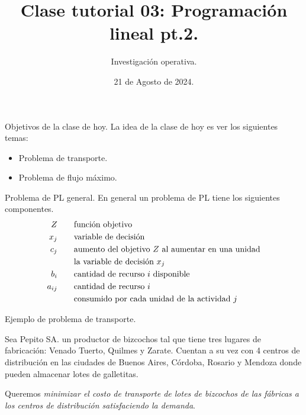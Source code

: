 \documentclass{beamer}
\title[]{Clase tutorial 03: Programación lineal pt.2.}
\date{21 de Agosto de 2024.}
\author[]{ Investigación operativa.
  }
\institute{Universidad de San Andrés}
\begin{document}
\maketitle

\begin{frame}{Objetivos de la clase de hoy.}
  La idea de la clase de hoy es ver los siguientes temas:
  \begin{itemize}
    \item Problema de transporte.
    \item Problema de flujo máximo.
  \end{itemize}
\end{frame}

\begin{frame}[fragile]{Problema de PL general.}
  En general un problema de PL tiene los siguientes componentes.
  \begin{align*} \LARGE  
    Z  & \quad \quad \text{función objetivo} \\ 
    x_{j}  & \quad \quad \text{variable de decisión} \\
    c_{j}  & \quad \quad \text{aumento del objetivo $Z$ al aumentar en una unidad} \\
    & \quad \quad \text{la variable de decisión $x_{j}$} \\
    b_{i}  & \quad \quad \text{cantidad de recurso $i$ disponible} \\
    a_{ij}  & \quad \quad \text{cantidad de recurso $i$} \\
    & \quad \quad \text{consumido por cada unidad de la actividad $j$}
  \end{align*}
\end{frame}

\begin{frame}[fragile]{Ejemplo de problema de transporte.}


Sea Pepito SA. un productor de bizcochos tal que tiene tres lugares de fabricación: Venado Tuerto, Quilmes y Zarate. 
Cuentan a su vez con 4 centros de distribución en las ciudades de Buenos Aires, Córdoba, Rosario y Mendoza donde pueden almacenar lotes de galletitas.

\pause  

\medskip 

Queremos \emph{minimizar el costo de transporte de lotes de bizcochos de las fábricas a los centros de distribución satisfaciendo la demanda}.

\end{frame}
\end{document}
